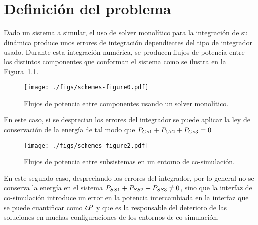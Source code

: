 


\chapter{Definición del problema}
\label{ch:definicion}





Dado un sistema a simular, el uso de solver monolítico para la integración de su dinámica produce unos errores de integración dependientes del tipo de integrador usado. Durante esta integración numérica, se producen flujos de potencia entre los distintos componentes que conforman el sistema como se ilustra en la Figura~\ref{fig:mono}.

\begin{figure}[ht!]\centering
	\texttt{[image: ./figs/schemes-figure0.pdf]}
	\caption{Flujos de potencia entre componentes usando un solver monolítico.}
	\label{fig:mono}
\end{figure}

En este caso, si se desprecian los errores del integrador se puede aplicar la ley de conservación de la energía de tal modo que $P_{Co1} + P_{Co2} + P_{Co3} = 0$

\begin{figure}[ht!]\centering
	\texttt{[image: ./figs/schemes-figure2.pdf]}
	\caption{Flujos de potencia entre subsistemas en un entorno de co-simulación.}
	\label{fig:cosim}
\end{figure}


En este segundo caso, despreciando los errores del integrador, por lo general no se conserva la energía en el sistema $P_{SS1} + P_{SS2} + P_{SS3} \neq 0$, sino que la interfaz de co-simulación introduce un error en la potencia intercambiada en la interfaz que se puede cuantificar como $\delta P$ y que es la responsable del deterioro de las soluciones en muchas configuraciones de los entornos de co-simulación.

